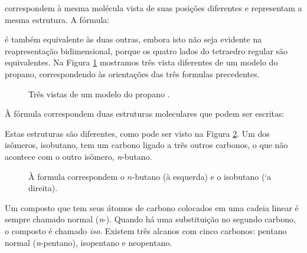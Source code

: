 \noindent correspondem à mesma molécula vista de suas posições diferentes e representam a mesma estrutura. A fórmula:

\begin{tightcenter}
\end{tightcenter}

\noindent é também equivalente às duas outras, embora isto não seja evidente na reapresentação bidimensional, porque os quatro lados do tetraedro regular são equivalentes. Na Figura \ref{fig3_2} mostramos três vista diferentes de um modelo do propano, correspondendo às orientações das três formulas precedentes.

\begin{figure}[H]
    \centering
    \caption{Três vistas de um modelo do propano .}
    \label{fig3_2}
\end{figure}

À fórmula  correspondem duas estruturas moleculares que podem ser escritas:

\begin{tightcenter}
    \qquad\qquad
    \chemnameinit{}
\end{tightcenter}

\noindent Estas estruturas são diferentes, como pode ser visto na Figura \ref{fig3_3}. Um dos isômeros, isobutano, tem um carbono ligado a três outros carbonos, o que não acontece com o outro isômero, \emph{n}-butano.

\begin{figure}[H]
    \centering
    \caption{À formula  correspondem o $n$-butano (à esquerda) e o isobutano (`a direita).}
    \label{fig3_3}
\end{figure}

Um composto que tem seus átomos de carbono colocados em uma cadeia linear é sempre chamado normal (\emph{n}-). Quando há uma substituição no segundo carbono, o composto é chamado \emph{iso}. Existem três alcanos com cinco carbonos: pentano normal (\emph{n}-pentano), isopentano e neopentano.

